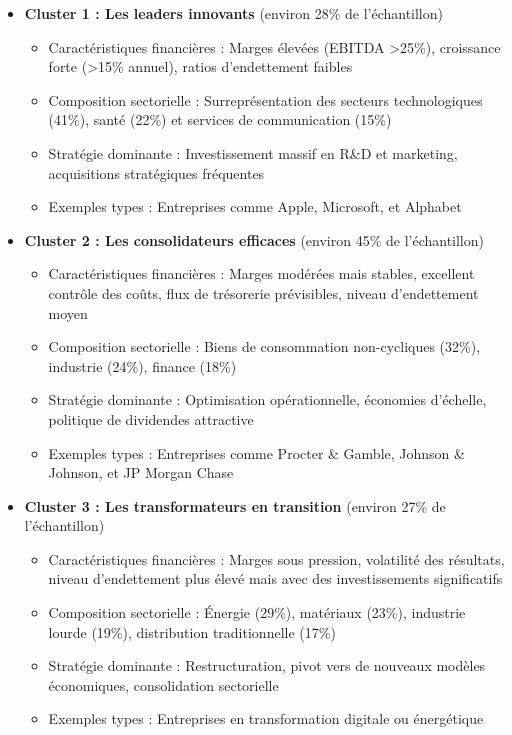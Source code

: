 \documentclass[11pt]{report}
\begin{document}
\begin{itemize}
    \item \textbf{Cluster 1 : Les leaders innovants} (environ 28\% de l'échantillon)
    \begin{itemize}
        \item Caractéristiques financières : Marges élevées (EBITDA >25\%), croissance forte (>15\% annuel), ratios d'endettement faibles
        \item Composition sectorielle : Surreprésentation des secteurs technologiques (41\%), santé (22\%) et services de communication (15\%)
        \item Stratégie dominante : Investissement massif en R\&D et marketing, acquisitions stratégiques fréquentes
        \item Exemples types : Entreprises comme Apple, Microsoft, et Alphabet
    \end{itemize}
    
    \item \textbf{Cluster 2 : Les consolidateurs efficaces} (environ 45\% de l'échantillon)
    \begin{itemize}
        \item Caractéristiques financières : Marges modérées mais stables, excellent contrôle des coûts, flux de trésorerie prévisibles, niveau d'endettement moyen
        \item Composition sectorielle : Biens de consommation non-cycliques (32\%), industrie (24\%), finance (18\%)
        \item Stratégie dominante : Optimisation opérationnelle, économies d'échelle, politique de dividendes attractive
        \item Exemples types : Entreprises comme Procter \& Gamble, Johnson \& Johnson, et JP Morgan Chase
    \end{itemize}
    
    \item \textbf{Cluster 3 : Les transformateurs en transition} (environ 27\% de l'échantillon)
    \begin{itemize}
        \item Caractéristiques financières : Marges sous pression, volatilité des résultats, niveau d'endettement plus élevé mais avec des investissements significatifs
        \item Composition sectorielle : Énergie (29\%), matériaux (23\%), industrie lourde (19\%), distribution traditionnelle (17\%)
        \item Stratégie dominante : Restructuration, pivot vers de nouveaux modèles économiques, consolidation sectorielle
        \item Exemples types : Entreprises en transformation digitale ou énergétique
    \end{itemize}
\end{itemize}
\end{document}
